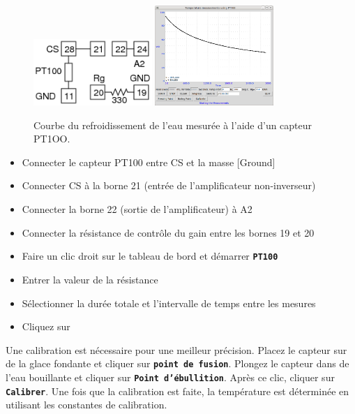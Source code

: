\documentclass{book}
\newcommand{\nop}{}
\begin{document}
\begin{figure}[h!]
\begin{center}
\caption{\label{fig:Cooling-curve-water}Courbe du refroidissement de l'eau mesurée à l'aide d'un capteur PT1OO. }\vspace{0.5em}
\includegraphics[width=0.4\textwidth, height=0.3\textwidth, keepaspectratio]{Schematic-pt100.png}
\includegraphics[width=0.4\textwidth, height=0.3\textwidth, keepaspectratio]{Pic-cooling-water-pt100.png}
\end{center}
\end{figure}



\begin{itemize}
  \item Connecter le capteur PT100 entre CS et la masse [Ground]
  \item Connecter CS à la borne 21 (entrée de l'amplificateur non-inverseur)
  \item Connecter la borne 22 (sortie de l'amplificateur) à A2
  \item Connecter la résistance de contrôle du gain entre les bornes 19 et 20
  \item Faire un clic droit sur le tableau de bord et démarrer  \texttt{\textbf{PT100}\nop}
  \item Entrer la valeur de la résistance
  \item Sélectionner la durée totale et l'intervalle de temps entre les mesures
  \item Cliquez sur  
\end{itemize}
Une calibration est nécessaire pour une meilleur précision. Placez le capteur sur de la glace fondante et cliquer sur  \texttt{\textbf{point de fusion}\nop}. Plongez le capteur dans de l'eau bouillante et cliquer sur  \texttt{\textbf{Point d'ébullition}\nop}. Après ce clic, cliquer sur \texttt{\textbf{Calibrer}\nop}. Une fois que la calibration est faite, la température est déterminée en utilisant les constantes de calibration.
\end{document}
